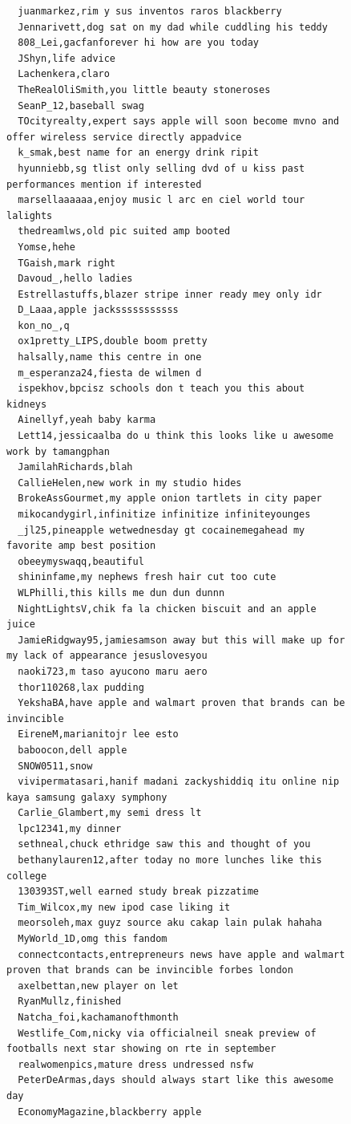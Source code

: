 \begin{figure}[htpb]
\begin{verbatim}
  juanmarkez,rim y sus inventos raros blackberry
  Jennarivett,dog sat on my dad while cuddling his teddy
  808_Lei,gacfanforever hi how are you today
  JShyn,life advice
  Lachenkera,claro
  TheRealOliSmith,you little beauty stoneroses
  SeanP_12,baseball swag
  TOcityrealty,expert says apple will soon become mvno and offer wireless service directly appadvice
  k_smak,best name for an energy drink ripit
  hyunniebb,sg tlist only selling dvd of u kiss past performances mention if interested
  marsellaaaaaa,enjoy music l arc en ciel world tour lalights
  thedreamlws,old pic suited amp booted
  Yomse,hehe
  TGaish,mark right
  Davoud_,hello ladies
  Estrellastuffs,blazer stripe inner ready mey only idr
  D_Laaa,apple jacksssssssssss
  kon_no_,q
  ox1pretty_LIPS,double boom pretty
  halsally,name this centre in one
  m_esperanza24,fiesta de wilmen d
  ispekhov,bpcisz schools don t teach you this about kidneys
  Ainellyf,yeah baby karma
  Lett14,jessicaalba do u think this looks like u awesome work by tamangphan
  JamilahRichards,blah
  CallieHelen,new work in my studio hides
  BrokeAssGourmet,my apple onion tartlets in city paper
  mikocandygirl,infinitize infinitize infiniteyounges
  _jl25,pineapple wetwednesday gt cocainemegahead my favorite amp best position
  obeeymyswaqq,beautiful
  shininfame,my nephews fresh hair cut too cute
  WLPhilli,this kills me dun dun dunnn
  NightLightsV,chik fa la chicken biscuit and an apple juice
  JamieRidgway95,jamiesamson away but this will make up for my lack of appearance jesuslovesyou
  naoki723,m taso ayucono maru aero
  thor110268,lax pudding
  YekshaBA,have apple and walmart proven that brands can be invincible
  EireneM,marianitojr lee esto
  baboocon,dell apple
  SNOW0511,snow
  vivipermatasari,hanif madani zackyshiddiq itu online nip kaya samsung galaxy symphony
  Carlie_Glambert,my semi dress lt
  lpc12341,my dinner
  sethneal,chuck ethridge saw this and thought of you
  bethanylauren12,after today no more lunches like this college
  130393ST,well earned study break pizzatime
  Tim_Wilcox,my new ipod case liking it
  meorsoleh,max guyz source aku cakap lain pulak hahaha
  MyWorld_1D,omg this fandom
  connectcontacts,entrepreneurs news have apple and walmart proven that brands can be invincible forbes london
  axelbettan,new player on let
  RyanMullz,finished
  Natcha_foi,kachamanofthmonth
  Westlife_Com,nicky via officialneil sneak preview of footballs next star showing on rte in september
  realwomenpics,mature dress undressed nsfw
  PeterDeArmas,days should always start like this awesome day
  EconomyMagazine,blackberry apple

\end{verbatim}
\end{figure}
